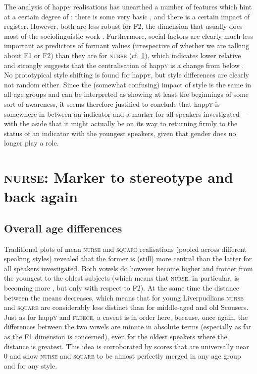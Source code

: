 The analysis of happ\textsc{y} realisations has unearthed a number of features which hint at a certain degree of : there is some very basic , and there is a certain impact of register.
However, both are less robust for F2, the  dimension that usually does most of the sociolinguistic work \parencite[cf.][502]{labov2006a}.
Furthermore, social factors are clearly much less important as predictors of formant values (irrespective of whether we are talking about F1 or F2) than they are for \textsc{nurse} (cf. \ref{prod.disc.nurse}), which indicates lower relative  and strongly suggests that the centralisation of happ\textsc{y} is a change from below \parencite[cf.][78]{labov1994}.
No prototypical style shifting is found for happ\textsc{y}, but style differences are clearly not random either.
Since the (somewhat confusing) impact of style is the same in all age groups and can be interpreted as showing at least the beginnings of some sort of awareness, it seems therefore justified to conclude that happ\textsc{y} is somewhere in between an indicator and a marker for all speakers investigated --- with the aside that it might actually be on its way to returning firmly to the status of an indicator with the youngest speakers, given that gender does no longer play a role.

\section{\textrm{\textsc{nurse}}: Marker to stereotype and back again}
\label{prod.disc.nurse}

\subsection{Overall age differences}
\label{prod.disc.nurse.age}

Traditional  plots of mean \textsc{nurse} and \textsc{square} realisations (pooled across different speaking styles) revealed that the former is (still) more central than the latter for all speakers investigated.
Both vowels do however become higher and fronter from the youngest to the oldest subjects (which means that \textsc{nurse}, in particular, is becoming more , but only with respect to F2).
At the same time the distance between the means decreases, which means that for young Liverpudlians \textsc{nurse} and \textsc{square} are considerably less distinct than for middle-aged and old Scousers.
Just as for happ\textsc{y} and \textsc{fleece}, a caveat is in order here, because, once again, the differences between the two vowels are minute in absolute terms (especially as far as the F1 dimension is concerned), even for the oldest speakers where the distance is greatest.
This idea is corroborated by  scores that are universally near 0 and show \textsc{nurse} and \textsc{square} to be almost perfectly merged in any age group and for any style.

